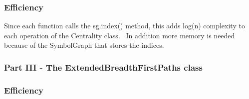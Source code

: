 \documentclass[11pt]{article}
\begin{document}
\subsubsection*{Efficiency}
Since each function calls the sg.index() method, this adds log(n) complexity to each operation of the Centrality class. 
In addition more memory is needed because of the SymbolGraph that stores the indices.

\subsubsection*{Part III - The ExtendedBreadthFirstPaths class}

\subsubsection*{Efficiency}
\end{document}
